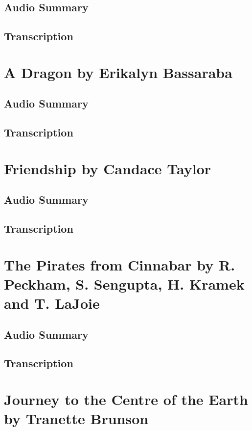 \subsection{Audio Summary}

\subsection{Transcription}

\section{A Dragon by Erikalyn Bassaraba}

\subsection{Audio Summary}

\subsection{Transcription}

\section{Friendship by Candace Taylor}

\subsection{Audio Summary}

\subsection{Transcription}

\section{The Pirates from Cinnabar by R. Peckham, S. Sengupta, H. Kramek and T. LaJoie}

\subsection{Audio Summary}

\subsection{Transcription}

\section{Journey to the Centre of the Earth by Tranette Brunson}

